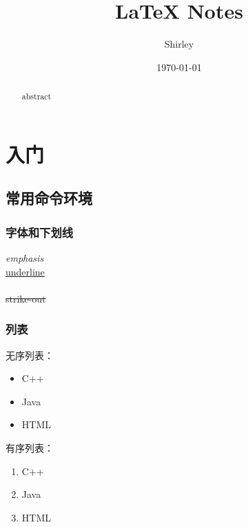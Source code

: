 \documentclass[a4paper,12pt,draft]{report}
\begin{document}
 
\title{LaTeX Notes} 
\author{Shirley} 
\date{\today} 
\maketitle

 \begin{abstract}%
abstract
\end{abstract}
 
  \setcounter{tocdepth}{2} %
   \tableofcontents   %

 \chapter{入门}%
 
 \section{常用命令环境}
  \subsection{字体和下划线}
 \emph{emphasis}\\ 
 \uline{underline}\\ 
 \\ 
 \sout{strike-out}
 
 \subsection{列表}

无序列表：
\begin{itemize}
	\item C++
	\item Java
	\item HTML
\end{itemize}

有序列表：
\begin{enumerate}
	\item C++
	\item Java
	\item HTML
\end{enumerate}
\end{document}
